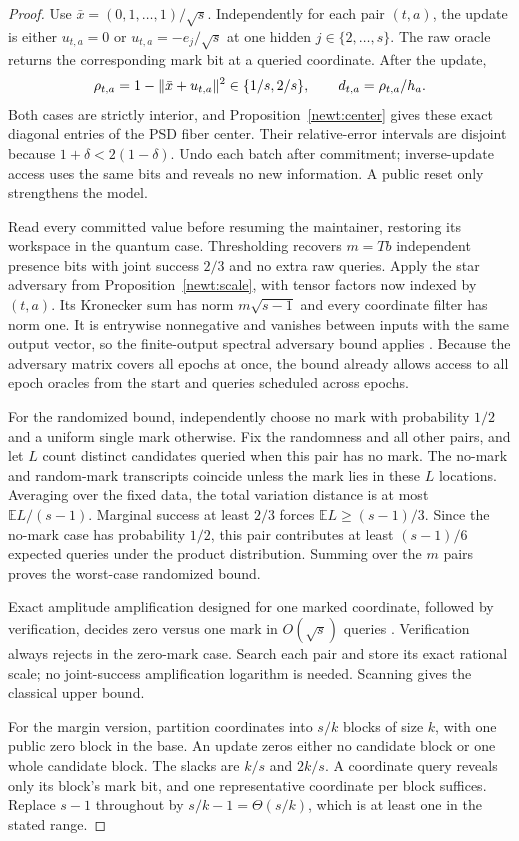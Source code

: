 \begin{proof}
Use $\bar x=(0,1,\ldots,1)/\sqrt s$.  Independently for each pair
$(t,a)$, the update is either $u_{t,a}=0$ or
$u_{t,a}=-e_j/\sqrt s$ at one hidden $j\in\{2,\ldots,s\}$.
The raw oracle returns the corresponding mark bit at a queried coordinate.
After the update,
\[
 \rho_{t,a}=1-\lVert \bar x+u_{t,a}\rVert^2\in\{1/s,2/s\},
 \qquad d_{t,a}=\rho_{t,a}/h_a.
\]
Both cases are strictly interior, and Proposition~\ref{newt:center}
gives these exact diagonal entries of the PSD fiber center.  Their relative-error intervals
are disjoint because $1+\delta<2(1-\delta)$.
Undo each batch after commitment; inverse-update access uses the same
bits and reveals no new information.  A public reset only strengthens
the model.

Read every committed value before resuming the maintainer, restoring its
workspace in the quantum case.  Thresholding recovers $m=Tb$ independent
presence bits with joint success $2/3$ and no extra raw queries.  Apply the
star adversary from Proposition~\ref{newt:scale}, with tensor factors now
indexed by $(t,a)$.  Its Kronecker sum has norm $m\sqrt{s-1}$ and every
coordinate filter has norm one.  It is entrywise nonnegative and vanishes
between inputs with the same output vector, so the finite-output spectral
adversary bound applies \citep[Theorems~3--4]{ACGT2010}.  Because the
adversary matrix covers all epochs at once, the bound already allows
access to all epoch oracles from the start and queries scheduled across
epochs.

For the randomized bound, independently choose no mark with probability
$1/2$ and a uniform single mark otherwise.  Fix the randomness and all
other pairs, and let $L$ count distinct candidates queried when this pair
has no mark.  The no-mark and random-mark transcripts coincide unless
the mark lies in these $L$ locations.  Averaging over the fixed data, the
total variation distance is at most $\mathbb E L/(s-1)$.
Marginal success at least $2/3$
forces $\mathbb E L\geq(s-1)/3$.  Since the no-mark case has probability
$1/2$, this pair contributes at least $(s-1)/6$ expected queries under
the product distribution.  Summing over the $m$ pairs proves the
worst-case randomized bound.

Exact amplitude amplification designed for one marked coordinate,
followed by verification, decides zero versus one mark in $O(\sqrt s)$
queries \citep[Theorems~4 and~16]{BHMT2002}.  Verification always rejects
in the zero-mark case.  Search each pair and store its exact rational
scale; no joint-success amplification logarithm is needed.  Scanning
gives the classical upper bound.

For the margin version, partition coordinates into $s/k$ blocks of size
$k$, with one public zero block in the base.  An update zeros either no
candidate block or one whole candidate block.  The slacks are $k/s$ and
$2k/s$.  A coordinate query reveals only its block's mark bit, and one
representative coordinate per block suffices.  Replace $s-1$ throughout
by $s/k-1=\Theta(s/k)$, which is at least one in the stated range.
\end{proof}

